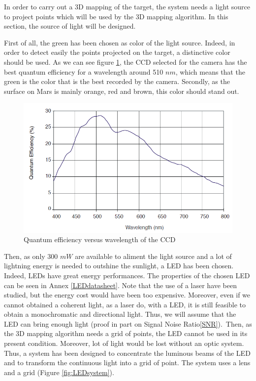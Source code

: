 In order to carry out a 3D mapping of the target, the system needs a light source to project points which will be used by the 3D mapping algorithm. In this section, the source of light will be designed.

First of all, the green has been chosen as color of the light source. Indeed, in order to detect easily the points projected on the target, a distinctive color should be used. As we can see figure \ref{fig:QeCCD}, the CCD selected for the camera has the best quantum efficiency for a wavelength around 510 $nm$, which means that the green is the color that is the best recorded by the camera. Secondly, as the surface on Mars is mainly orange, red and brown, this color should stand out.


\begin{figure}[h]
  \centerline{\includegraphics[scale=0.4]{fig/QeCCD.png}}
  \caption{Quantum efficiency versus wavelength of the CCD}
  \label{fig:QeCCD}
\end{figure}

Then, as only 300 $mW$ are available to aliment the light source and a lot of lightning energy is needed to outshine the sunlight, a LED has been chosen. Indeed, LEDs have great energy performances. The properties of the chosen LED can be seen in Annex \ref{LEDdatasheet}. Note that the use of a laser have been studied, but the energy cost would have been too expensive. Moreover, even if we cannot obtained a coherent light, as a laser do, with a LED, it is still feasible to obtain a monochromatic and directional light. Thus, we will assume that the LED can bring enough light (proof in part on Signal Noise Ratio\ref{SNR}).\
Then, as the 3D mapping algorithm needs a grid of points, the LED cannot be used in its present condition. Moreover, lot of light would be lost without an optic system. Thus, a system has been designed to concentrate the luminous beams of the LED and to transform the continuous light into a grid of point. The system uses a lens and a grid (Figure \ref{fig:LEDsystem}). 

